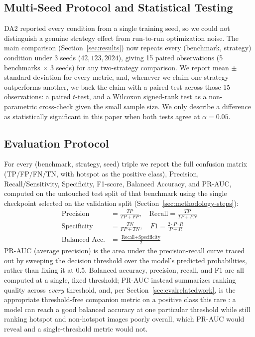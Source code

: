 \documentclass[conference]{IEEEtran}
\begin{document}
\subsection{Multi-Seed Protocol and Statistical Testing}
\label{sec:stats}
DA2 reported every condition from a single training seed, so we could
not distinguish a genuine strategy effect from run-to-run optimization
noise. The main comparison (Section~\ref{sec:results}) now repeats
every (benchmark, strategy) condition under 3 seeds
($42, 123, 2024$), giving 15 paired observations (5 benchmarks
$\times$ 3 seeds) for any two-strategy comparison. We report mean
$\pm$ standard deviation for every metric, and, whenever we claim one
strategy outperforms another, we back the claim with a paired test
across those 15 observations: a paired $t$-test, and a Wilcoxon
signed-rank test \cite{demsar2006statistical,dietterich1998approximate}
as a non-parametric cross-check given the small sample size. We only
describe a difference as statistically significant in this paper when
both tests agree at $\alpha=0.05$.

\subsection{Evaluation Protocol}
\label{sec:eval}
For every (benchmark, strategy, seed) triple we report the full
confusion matrix (TP/FP/FN/TN, with hotspot as the positive class),
Precision, Recall/Sensitivity, Specificity, F1-score, Balanced
Accuracy, and PR-AUC, computed on the untouched test split of that
benchmark using the single checkpoint selected on the validation split
(Section~\ref{sec:methodology-steps}):
\begin{align}
  \text{Precision} &= \frac{TP}{TP+FP}, \quad
  \text{Recall} = \frac{TP}{TP+FN} \\
  \text{Specificity} &= \frac{TN}{FP+TN}, \quad
  F1 = \frac{2 \cdot P \cdot R}{P + R} \\
  \text{Balanced Acc.} &= \frac{\text{Recall} + \text{Specificity}}{2}
\end{align}
PR-AUC (average precision) is the area under the precision-recall
curve traced out by sweeping the decision threshold over the model's
predicted probabilities, rather than fixing it at 0.5. Balanced
accuracy, precision, recall, and F1 are all computed at a single,
fixed threshold; PR-AUC instead summarizes ranking quality across
\emph{every} threshold, and, per
Section~\ref{sec:evalrelatedwork}, is the appropriate threshold-free
companion metric on a positive class this rare
\cite{davis2006relationship,saito2015prplot}: a model can reach a
good balanced accuracy at one particular threshold while still
ranking hotspot and non-hotspot images poorly overall, which PR-AUC
would reveal and a single-threshold metric would not.
\end{document}
